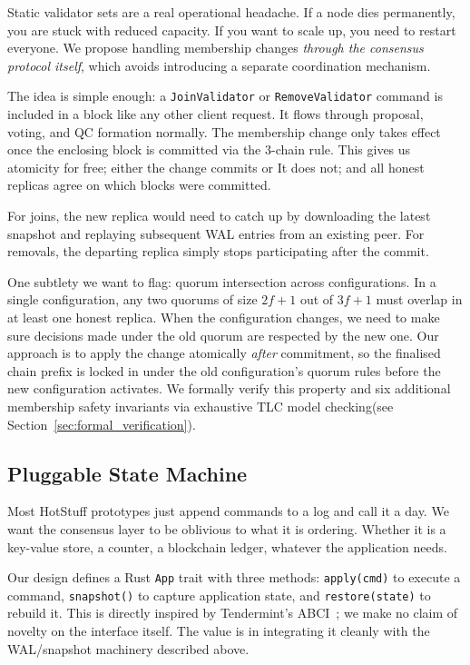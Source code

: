 \documentclass{SVProc}
\begin{document}
Static validator sets are a real operational headache. If a node dies permanently, you are stuck with reduced capacity. If you want to scale up, you need to restart everyone.  We propose handling membership changes \emph{through the consensus protocol itself}, which avoids introducing a separate coordination mechanism.

The idea is simple enough: a \texttt{JoinValidator} or \texttt{RemoveValidator} command is included in a block like any other client request. It flows through proposal, voting, and QC formation normally. The membership change only takes effect once the enclosing block is committed via the 3-chain rule. This gives us atomicity for free; either the change commits or
It does not; and all honest replicas agree on which blocks were committed.

For joins, the new replica would need to catch up by downloading the latest snapshot and replaying subsequent WAL entries from an existing peer. For removals, the departing replica simply stops participating after the commit.

One subtlety we want to flag: quorum intersection across
configurations. In a single configuration, any two quorums of size $2f{+}1$ out of $3f{+}1$ must overlap in at least one honest replica. When the configuration changes, we need to make sure decisions made under the old quorum are respected by the new one. Our approach is to apply the change atomically \emph{after} commitment, so the finalised chain prefix is locked in under the old configuration's quorum rules before the new configuration activates.  We formally verify this property and six additional membership safety invariants via exhaustive TLC model checking(see Section~\ref{sec:formal_verification}).

\subsection{Pluggable State Machine}
\label{sec:pluggable_sm}

Most HotStuff prototypes just append commands to a log and call it a day. We want the consensus layer to be oblivious to what it is ordering. Whether it is a key-value store, a counter, a blockchain ledger, whatever the application needs.

Our design defines a Rust \texttt{App} trait with three methods:
\texttt{apply(cmd)} to execute a command, \texttt{snapshot()} to
capture application state, and \texttt{restore(state)} to rebuild it. This is directly inspired by Tendermint's ABCI~\cite{tendermint}; we make no claim of novelty on the interface itself. The value is in integrating it cleanly with the WAL/snapshot machinery described above.
\end{document}
